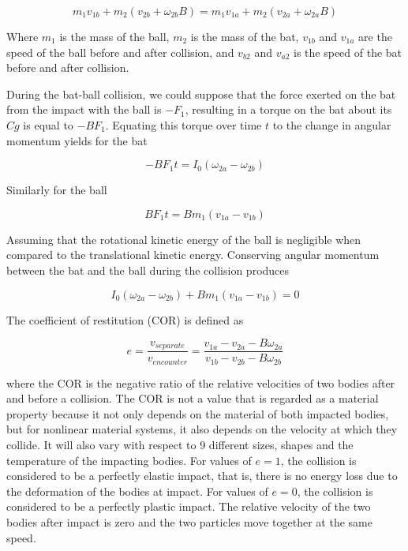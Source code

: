 \begin{equation}
m_1v_{1b}+m_2(v_{2b}+\omega_{2b}B)=m_1v_{1a}+m_2(v_{2a}+\omega_{2a}B)
\end{equation}

Where $m_1$ is the mass of the ball, $m_2$ is the mass of the bat, $v_{1b}$ and $v_{1a}$ are the speed of the ball before and after collision, and $v_{b2}$ and $v_{a2}$ is the speed of the bat before and after collision.


During the bat-ball collision, we could suppose that the force exerted on the bat from the impact with the ball is $-F_1$, resulting in a torque on the bat about its $Cg$ is equal to $-BF_1$. Equating this torque over time $t$ to the change in angular momentum yields for the bat

\[
-BF_1t=I_0(\omega_{2a}-\omega_{2b})
\]

Similarly for the ball

\[
BF_1t=Bm_1(v_{1a}-v_{1b})
\]

Assuming that the rotational kinetic energy of the ball is negligible when compared to the translational kinetic energy. Conserving angular momentum between the bat and the ball during the collision produces

\begin{equation}
I_0(\omega_{2a}-\omega_{2b})+Bm_1(v_{1a}-v_{1b})=0
\end{equation}

The coefficient of restitution (COR) is defined as

\begin{equation}
e=\frac{v_{separate}}{v_{encounter}}=\frac{v_{1a}-v_{2a}-B\omega_{2a}}{v_{1b}-v_{2b}-B\omega_{2b}}
\end{equation}

where the COR is the negative ratio of the relative velocities of two bodies after and before a collision. The COR is not a value that is regarded as a material property because it not only depends on the material of both impacted bodies, but for nonlinear material systems, it also depends on the velocity at which they collide. It will also vary with respect to 9 different sizes, shapes and the temperature of the impacting bodies. For values of $e=1$, the collision is considered to be a perfectly elastic impact, that is, there is no energy loss due to the deformation of the bodies at impact. For values of $e=0$, the collision is considered to be a perfectly plastic impact. The relative velocity of the two bodies after impact is zero and the two particles move together at the same speed.

